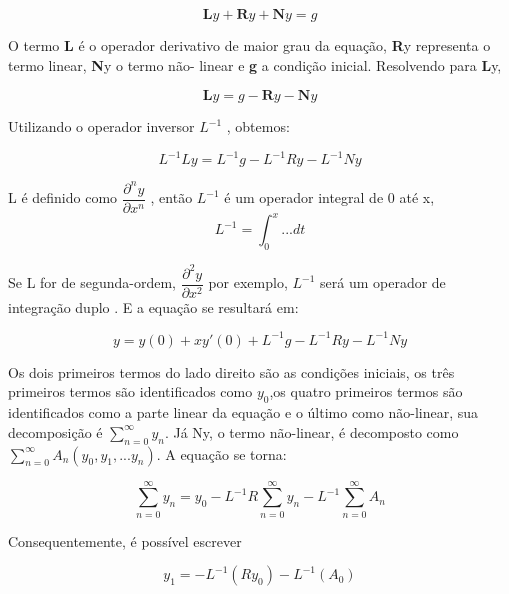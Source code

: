  \begin{equation}  \textbf{L}y +  \textbf{R}y +  \textbf{N}y = g\end{equation}

O termo \textbf{L} é o operador derivativo de maior grau da equação, \textbf{R}y representa o termo linear, \textbf{N}y o termo não- linear e \textbf{g} a condição inicial. Resolvendo para \textbf{L}y,

 \begin{equation}  \textbf{L}y =  g - \textbf{R}y - \textbf{N}y \end{equation}
 
  Utilizando o operador inversor $L^{-1}$ , obtemos:
  
  \begin{equation}
  L^{-1}Ly =  L^{-1}g -  L^{-1}Ry -  L^{-1}Ny
  \end{equation}
  
  L é definido como $\dfrac{\partial^ny }{\partial x^n}$ , então $L^{-1}$ é um operador integral de 0 até x,
  \begin{equation}
  L^{-1}= \int_0^{x} ...dt
  \end{equation}
  
  Se L for de segunda-ordem, $\dfrac{\partial^2y}{\partial x^2}$ por exemplo, $L^{-1}$ será um operador de integração duplo . E a equação se resultará em:
  
  \begin{equation}
  y= y(0) + xy'(0) + L^{-1}g - L^{-1}Ry - L^{-1}Ny
  \end{equation}

 Os dois primeiros termos do lado direito são as condições iniciais, os três primeiros termos são identificados como  $y_{0}$,os quatro primeiros termos são identificados como a parte linear da equação e o último como não-linear, sua decomposição é $\sum_{n=0}^{\infty} y_{n}$. Já Ny, o termo não-linear, é decomposto como $\sum_{n=0}^{\infty} A_{n}(y_{0},y_{1},...y_{n})$. A equação se torna:
 
 \begin{equation}
 \sum_{n=0}^{\infty} y_{n} = y_{0} - L^{-1}R \sum_{n=0}^{\infty} y_{n} - L^{-1}\sum_{n=0}^{\infty} A_{n}
 \end{equation}
 
 Consequentemente, é possível escrever
 
 \begin{equation}
 y_{1} = -L^{-1} (Ry_{0}) - L^{-1}(A_{0}) \end{equation}
 
